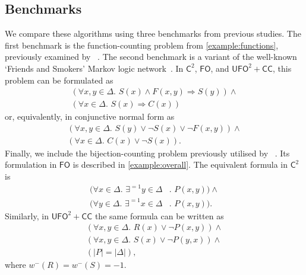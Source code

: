 \documentclass[letterpaper]{article} %
\theoremstyle{remark}
\theoremstyle{definition}
\newcommand{\Ctwo}{$\mathsf{C}^{2}$}
\newcommand{\FO}{$\mathsf{FO}$}
\newcommand{\UFO}{$\mathsf{UFO}^{2} + \mathsf{CC}$}
\newcommand{\Cranetwo}{\textsc{Gantry}}
\begin{document}



\subsection{Benchmarks}
We compare these algorithms using three benchmarks from previous studies. The
first benchmark is the function-counting problem from \cref{example:functions},
previously examined by
\citeauthor{DBLP:conf/kr/DilkasB23}~. The
second benchmark is a variant of the well-known `Friends and Smokers' Markov
logic network~\cite{DBLP:conf/aaai/SinglaD08,DBLP:conf/uai/BroeckCD12}. In
\Ctwo{}, \FO{}, and \UFO{}, this problem can be formulated as
\begin{gather*}
  (\forall x,y \in \Delta\text{. } S(x) \land F(x, y) \Rightarrow S(y)) \land{}\\
  (\forall x \in \Delta\text{. }S(x) \Rightarrow C(x))
\end{gather*}
or, equivalently, in conjunctive normal form as
\begin{gather*}
  (\forall x,y \in \Delta\text{. }S(y) \lor \neg S(x) \lor \neg F(x, y)) \land{}\\
  (\forall x \in \Delta\text{. } C(x) \lor \neg S(x)).
\end{gather*}
Finally, we include the bijection-counting problem previously utilised by
\citeauthor{DBLP:conf/kr/DilkasB23}~. Its
formulation in \FO{} is described in \cref{example:overall}. The equivalent
formula in \Ctwo{} is
\begin{align*}
  (\forall x \in \Delta\text{. }\exists^{=1} y \in \Delta&\text{. }P(x, y))\land{}\\
  (\forall y \in \Delta\text{. }\exists^{=1} x \in \Delta&\text{. }P(x, y)).
\end{align*}
Similarly, in \UFO{} the same formula can be written as
\begin{gather*}
  (\forall x, y \in \Delta\text{. }R(x) \lor \neg P(x, y))\land{}\\
  (\forall x, y \in \Delta\text{. }S(x) \lor \neg P(y, x))\land{}\\
  (|P| = |\Delta|),
\end{gather*}
where $w^{-}(R) = w^{-}(S) = -1$.
\end{document}
